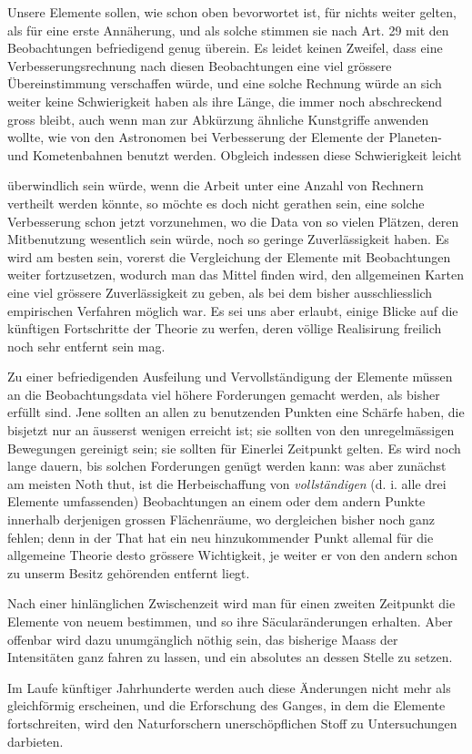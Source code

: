 Unsere Elemente sollen, wie schon oben bevorwortet ist, für nichts weiter gelten, als für eine erste Annäherung, und als solche stimmen sie nach Art. 29 mit den Beobachtungen befriedigend genug überein. Es leidet keinen Zweifel, dass eine Verbesserungsrechnung nach diesen Beobachtungen eine viel grössere Übereinstimmung verschaffen würde, und eine solche Rechnung würde an sich weiter keine Schwierigkeit haben als ihre Länge, die immer noch abschreckend gross bleibt, auch wenn man zur Abkürzung ähnliche Kunstgriffe anwenden wollte, wie von den Astronomen bei Verbesserung der Elemente der Planeten- und Kometenbahnen benutzt werden. Obgleich indessen diese Schwierigkeit leicht
\par\clearpage
{}
\noindent überwindlich sein würde, wenn die Arbeit unter eine Anzahl von Rechnern vertheilt werden könnte, so möchte es doch nicht gerathen sein, eine solche Verbesserung schon jetzt vorzunehmen, wo die Data von so vielen Plätzen, deren Mitbenutzung wesentlich sein würde, noch so geringe Zuverlässigkeit haben. Es wird am besten sein, vorerst die Vergleichung der Elemente mit Beobachtungen weiter fortzusetzen, wodurch man das Mittel finden wird, den allgemeinen Karten eine viel grössere Zuverlässigkeit zu geben, als bei dem bisher ausschliesslich empirischen Verfahren möglich war. Es sei uns aber erlaubt, einige Blicke auf die künftigen Fortschritte der Theorie zu werfen, deren völlige Realisirung freilich noch sehr entfernt sein mag.

Zu einer befriedigenden Ausfeilung und Vervollständigung der Elemente müssen an die Beobachtungsdata viel höhere Forderungen gemacht werden, als bisher erfüllt sind. Jene sollten an allen zu benutzenden Punkten eine Schärfe haben, die bisjetzt nur an äusserst wenigen erreicht ist; sie sollten von den unregelmässigen Bewegungen gereinigt sein; sie sollten für Einerlei Zeitpunkt gelten. Es wird noch lange dauern, bis solchen Forderungen genügt werden kann: was aber zunächst am meisten Noth thut, ist die Herbeischaffung von \textit{vollständigen} (d. i. alle drei Elemente umfassenden) Beobachtungen an einem oder dem andern Punkte innerhalb derjenigen grossen Flächenräume, wo dergleichen bisher noch ganz fehlen; denn in der That hat ein neu hinzukommender Punkt allemal für die allgemeine Theorie desto grössere Wichtigkeit, je weiter er von den andern schon zu unserm Besitz gehörenden entfernt liegt.

Nach einer hinlänglichen Zwischenzeit wird man für einen zweiten Zeitpunkt die Elemente von neuem bestimmen, und so ihre Säcularänderungen erhalten. Aber offenbar wird dazu unumgänglich nöthig sein, das bisherige Maass der Intensitäten ganz fahren zu lassen, und ein absolutes an dessen Stelle zu setzen.

Im Laufe künftiger Jahrhunderte werden auch diese Änderungen nicht mehr als gleichförmig erscheinen, und die Erforschung des Ganges, in dem die Elemente fortschreiten, wird den Naturforschern unerschöpflichen Stoff zu Untersuchungen darbieten.
\par\clearpage
